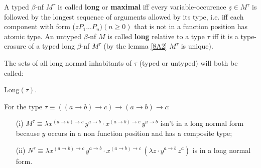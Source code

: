 \documentclass[a4paper,10pt]{article}
\begin{document}
\begin{mydef}
A typed $\beta$-nf $M^{\tau}$ is called \textbf{long} or \textbf{maximal} iff every variable-occurence $\underline{z} \in M^{\tau}$ is
followed by the longest sequence of arguments allowed by its type, i.e. iff each component with form ($z P_1 ... P_n)(n \geq 0)$ that is
not in a function position has atomic type. An untyped $\beta$-nf $M$ is called \textbf{long} relative to a type $\tau$ iff it is a 
type-erasure of a typed long $\beta$-nf $M^{\tau}$ (by the lemma \ref{8A2} $M^{\tau}$ is unique).
\end{mydef}

\begin{notation} The sets of all long normal inhabitants of $\tau$ (typed or untyped) will both be called:
\begin{center}
Long$(\tau)$.
\end{center} 
\end{notation}

\begin{exa} For the type $\tau \equiv ((a \to b) \to c) \to (a \to b) \to c$:
\begin{itemize}
 \item[(i)] $M^{\tau} \equiv \lambda x^{(a\to b) \to c} \, y^{a \to b} \cdot x^{(a \to b) \to c} \, y^{a \to b}$ isn't in a long normal form because $y$ occurs 
 in a non function position and has a composite type;
 \item[(ii)] $N^{\tau} \equiv \lambda x^{(a\to b) \to c} \, y^{a \to b} \cdot x^{(a \to b) \to c} \, (\lambda z \cdot y^{a \to b}\, z^a)$ is in a long normal form.
\end{itemize}
\end{exa}
\end{document}
